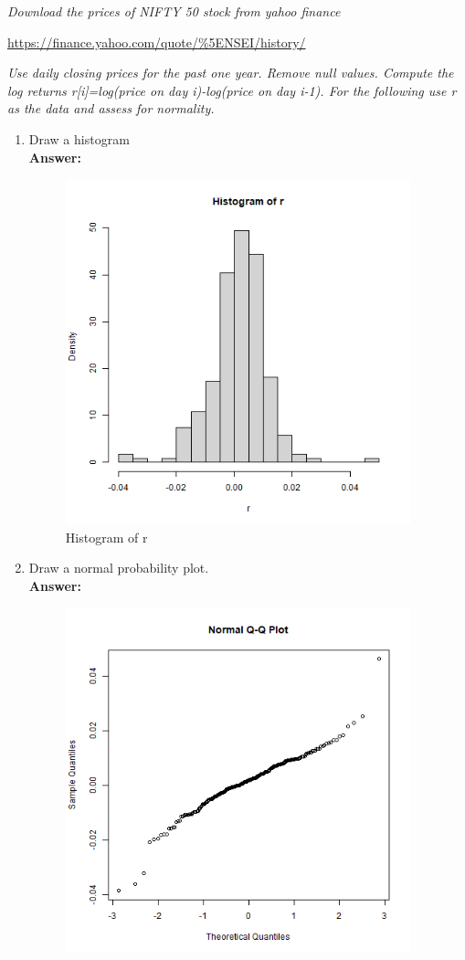 \documentclass[12pt,letterpaper]{article}
\begin{document}
\textit{Download the prices of NIFTY 50 stock from yahoo finance}
\begin{center}
  \url{https://finance.yahoo.com/quote/%5ENSEI/history/}
\end{center}
\textit{Use daily closing prices for the past one year.
Remove null values. Compute the log returns r[i]=log(price on day i)-log(price on day i-1).
For the following use r as the data and assess for normality.}
\begin{enumerate}
  \item Draw a histogram\\
  \textbf{Answer:}\\
  \begin{figure}[h]
    \centering
    \includegraphics[width=10cm]{Histogram.png}
    \caption{Histogram of r}
  \end{figure}
  \newpage
  \item Draw a normal probability plot.\\
  \textbf{Answer:}\\
  \begin{figure}[h]
    \centering
    \includegraphics[width=10cm]{NormalPlot.png}

\end{figure}
\end{enumerate}
\end{document}
